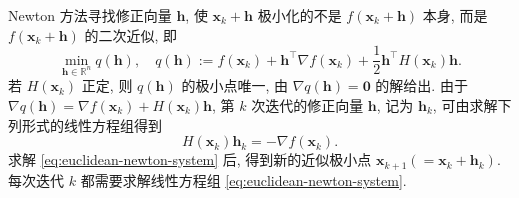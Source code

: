 {Newton 方法寻找修正向量 $\boldsymbol{h}$, 使 $\boldsymbol{x}_k+\boldsymbol{h}$ 极小化的不是 $f(\boldsymbol{x}_k+\boldsymbol{h})$ 本身, 而是 $f(\boldsymbol{x}_k+\boldsymbol{h})$ 的二次近似, 即}
\[\min_{\boldsymbol{h}\in\mathbb{R}^n}q(\boldsymbol{h}),\quad q(\boldsymbol{h}):=f(\boldsymbol{x}_k)+\boldsymbol{h}^{\top}\nabla f(\boldsymbol{x}_k)+\frac12\boldsymbol{h}^{\top}H(\boldsymbol{x}_k)\boldsymbol{h}.\]
{若 $H(\boldsymbol{x}_k)$ 正定, 则 $q(\boldsymbol{h})$ 的极小点唯一, 由 $\nabla q(\boldsymbol{h})=\boldsymbol{0}$ 的解给出. 由于 $\nabla q(\boldsymbol{h})=\nabla f(\boldsymbol{x}_k)+H(\boldsymbol{x}_k)\boldsymbol{h}$, 第 $k$ 次迭代的修正向量 $\boldsymbol{h}$, 记为 $\boldsymbol{h}_k$, 可由求解下列形式的线性方程组得到}
\begin{equation}\label{eq:euclidean-newton-system}
H(\boldsymbol{x}_k)\boldsymbol{h}_k=-\nabla f(\boldsymbol{x}_k).
\end{equation}
{求解 \eqref{eq:euclidean-newton-system} 后, 得到新的近似极小点 $\boldsymbol{x}_{k+1}(=\boldsymbol{x}_k+\boldsymbol{h}_k)$. 每次迭代 $k$ 都需要求解线性方程组 \eqref{eq:euclidean-newton-system}.}
